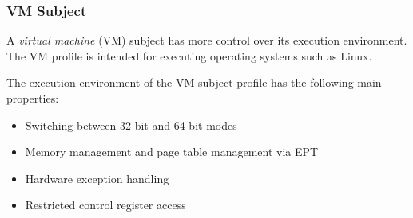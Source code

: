 \subsubsection{VM Subject}
A \emph{virtual machine} (VM) subject has more control over
its execution environment. The VM profile is intended for executing operating
systems such as Linux.

The execution environment of the VM subject profile has the following main
properties:

\begin{itemize}
	\item Switching between 32-bit and 64-bit modes
	\item Memory management and page table management via EPT
	\item Hardware exception handling
	\item Restricted control register access
\end{itemize}
